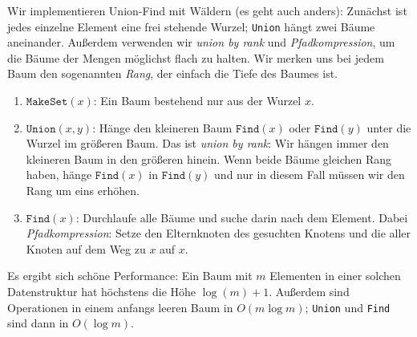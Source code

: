 \documentclass[11pt]{scrartcl}
\begin{document}
Wir implementieren Union-Find mit Wäldern (es geht auch anders): Zunächst ist jedes einzelne Element eine frei stehende Wurzel; \texttt{Union} hängt zwei Bäume aneinander. Außerdem verwenden wir \textit{union by rank} und \textit{Pfadkompression}, um die Bäume der Mengen möglichst flach zu halten. Wir merken uns bei jedem Baum den sogenannten \textit{Rang}, der einfach die Tiefe des Baumes ist.

\begin{enumerate}
\item $\texttt{MakeSet}(x)$: Ein Baum bestehend nur aus der Wurzel $x$.
\item $\texttt{Union}(x,y)$: Hänge den kleineren Baum $\texttt{Find}(x)$ oder $\texttt{Find}(y)$ unter die Wurzel im größeren Baum. Das ist \textit{union by rank}: Wir hängen immer den kleineren Baum in den größeren hinein. Wenn beide Bäume gleichen Rang haben, hänge $\texttt{Find}(x)$ in $\texttt{Find}(y)$ und nur in diesem Fall müssen wir den Rang um eins erhöhen.
\item $\texttt{Find}(x)$: Durchlaufe alle Bäume und suche darin nach dem Element. Dabei \textit{Pfadkompression}: Setze den Elternknoten des gesuchten Knotens und die aller Knoten auf dem Weg zu $x$ auf $x$.
\end{enumerate}

Es ergibt sich schöne Performance: Ein Baum mit $m$ Elementen in einer solchen Datenstruktur hat höchstens die Höhe $\log(m) + 1$. Außerdem sind Operationen in einem anfangs leeren Baum in $O(m \log m)$; \texttt{Union} und \texttt{Find} sind dann in $O(\log m)$.
\end{document}
